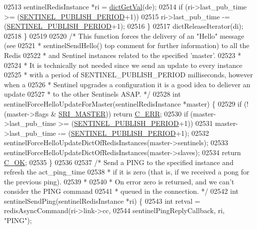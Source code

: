 \begin{DoxyCode}
{{{{{{{{{{{{{{{{{{{{{{{{{{{{{{{{{{{{{{{{{{{{{{{{{{{{{{{{{02513         sentinelRedisInstance *ri = \hyperlink{dict_8h_ae8d2cc391873b2bea2b87c4f80f43120}{dictGetVal}(de);
02514         \textcolor{keywordflow}{if} (ri->last\_pub\_time >= (\hyperlink{sentinel_8c_a062c8bab2521f90dac2df11cf77c3bf0}{SENTINEL\_PUBLISH\_PERIOD}+1))
02515             ri->last\_pub\_time -= (\hyperlink{sentinel_8c_a062c8bab2521f90dac2df11cf77c3bf0}{SENTINEL\_PUBLISH\_PERIOD}+1);
02516     \}
02517     dictReleaseIterator(di);
02518 \}
02519 
02520 \textcolor{comment}{/* This function forces the delivery of an "Hello" message (see}
02521 \textcolor{comment}{ * sentinelSendHello() top comment for further information) to all the Redis}
02522 \textcolor{comment}{ * and Sentinel instances related to the specified 'master'.}
02523 \textcolor{comment}{ *}
02524 \textcolor{comment}{ * It is technically not needed since we send an update to every instance}
02525 \textcolor{comment}{ * with a period of SENTINEL\_PUBLISH\_PERIOD milliseconds, however when a}
02526 \textcolor{comment}{ * Sentinel upgrades a configuration it is a good idea to deliever an update}
02527 \textcolor{comment}{ * to the other Sentinels ASAP. */}
02528 \textcolor{keywordtype}{int} sentinelForceHelloUpdateForMaster(sentinelRedisInstance *master) \{
02529     \textcolor{keywordflow}{if} (!(master->flags & \hyperlink{sentinel_8c_a2ee83e5ff67b45746cd6a310f15334b2}{SRI\_MASTER})) \textcolor{keywordflow}{return} \hyperlink{server_8h_af98ac28d5f4d23d7ed5985188e6fb7d1}{C\_ERR};
02530     \textcolor{keywordflow}{if} (master->last\_pub\_time >= (\hyperlink{sentinel_8c_a062c8bab2521f90dac2df11cf77c3bf0}{SENTINEL\_PUBLISH\_PERIOD}+1))
02531         master->last\_pub\_time -= (\hyperlink{sentinel_8c_a062c8bab2521f90dac2df11cf77c3bf0}{SENTINEL\_PUBLISH\_PERIOD}+1);
02532     sentinelForceHelloUpdateDictOfRedisInstances(master->sentinels);
02533     sentinelForceHelloUpdateDictOfRedisInstances(master->slaves);
02534     \textcolor{keywordflow}{return} \hyperlink{server_8h_a303769ef1065076e68731584e758d3e1}{C\_OK};
02535 \}
02536 
02537 \textcolor{comment}{/* Send a PING to the specified instance and refresh the act\_ping\_time}
02538 \textcolor{comment}{ * if it is zero (that is, if we received a pong for the previous ping).}
02539 \textcolor{comment}{ *}
02540 \textcolor{comment}{ * On error zero is returned, and we can't consider the PING command}
02541 \textcolor{comment}{ * queued in the connection. */}
02542 \textcolor{keywordtype}{int} sentinelSendPing(sentinelRedisInstance *ri) \{
02543     \textcolor{keywordtype}{int} retval = redisAsyncCommand(ri->link->cc,
02544         sentinelPingReplyCallback, ri, \textcolor{stringliteral}{"PING"});
}}}}}}}}}}}}}}}}}}}}}}}}}}}}}}}}}}}}}}}}}}}}}}}}}}}}}}}}}
\end{DoxyCode}
